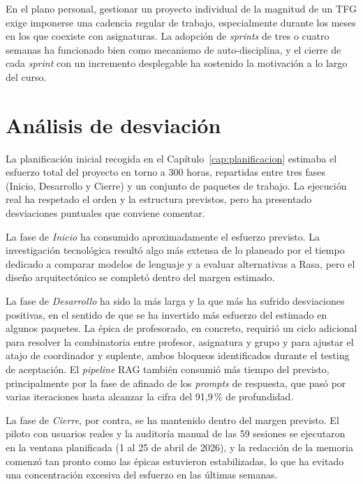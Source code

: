 En el plano personal, gestionar un proyecto individual de la magnitud de un TFG exige imponerse una cadencia regular de trabajo, especialmente durante los meses en los que coexiste con asignaturas. La adopción de \textit{sprints} de tres o cuatro semanas ha funcionado bien como mecanismo de auto-disciplina, y el cierre de cada \textit{sprint} con un incremento desplegable ha sostenido la motivación a lo largo del curso.

\section{Análisis de desviación}\label{sec:conc-desviacion}

La planificación inicial recogida en el Capítulo~\ref{cap:planificacion} estimaba el esfuerzo total del proyecto en torno a 300 horas, repartidas entre tres fases (Inicio, Desarrollo y Cierre) y un conjunto de paquetes de trabajo. La ejecución real ha respetado el orden y la estructura previstos, pero ha presentado desviaciones puntuales que conviene comentar.

La fase de \textit{Inicio} ha consumido aproximadamente el esfuerzo previsto. La investigación tecnológica resultó algo más extensa de lo planeado por el tiempo dedicado a comparar modelos de lenguaje y a evaluar alternativas a Rasa, pero el diseño arquitectónico se completó dentro del margen estimado.

La fase de \textit{Desarrollo} ha sido la más larga y la que más ha sufrido desviaciones positivas, en el sentido de que se ha invertido más esfuerzo del estimado en algunos paquetes. La épica de profesorado, en concreto, requirió un ciclo adicional para resolver la combinatoria entre profesor, asignatura y grupo y para ajustar el atajo de coordinador y suplente, ambos bloqueos identificados durante el testing de aceptación. El \textit{pipeline} RAG también consumió más tiempo del previsto, principalmente por la fase de afinado de los \textit{prompts} de respuesta, que pasó por varias iteraciones hasta alcanzar la cifra del 91,9\,\% de profundidad.

La fase de \textit{Cierre}, por contra, se ha mantenido dentro del margen previsto. El piloto con usuarios reales y la auditoría manual de las 59 sesiones se ejecutaron en la ventana planificada (1 al 25 de abril de 2026), y la redacción de la memoria comenzó tan pronto como las épicas estuvieron estabilizadas, lo que ha evitado una concentración excesiva del esfuerzo en las últimas semanas.

